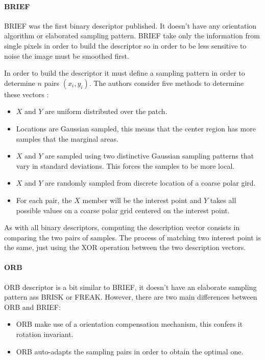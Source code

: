 \documentclass[9pt,shortpaper,twoside,web]{ieeecolor}
\begin{document}
\paragraph{BRIEF}
BRIEF was the first binary descriptor published. It doesn't have any orientation algorithm or elaborated sampling pattern. BRIEF take only the information from single pixels in order to build the descriptor so in order to be less sensitive to noise the image must be smoothed first.

In order to build the descriptor it must define a sampling pattern in order to determine $n$ pairs $(x_i,y_i)$. The authors consider five methods to determine these vectors \cite{b8} :

\begin{itemize}
\item $X$ and $Y$ are uniform distributed over the patch.

\item Locations are Gaussian sampled, this means that the center region has more samples that the marginal areas.

\item $X$ and $Y$ are sampled using two distinctive Gaussian sampling patterns that vary in standard deviations. This forces the samples to be more local.

\item $X$ and $Y$ are randomly sampled from discrete location of a coarse polar gird.

\item For each pair, the $X$ member will be the interest point and $Y$ takes all possible values on a coarse polar grid centered on the interest point.
\end{itemize}

As with all binary descriptors, computing the description vector consists in comparing the two pairs of samples. The process of matching two interest point is the same, just using the XOR operation between the two description vectors.
\\

\paragraph{ORB}
ORB descriptor is a bit similar to BRIEF, it doesn't have an elaborate sampling pattern ass BRISK or FREAK. However, there are two main differences between ORB and BRIEF:

\begin{itemize}
\item ORB make use of a orientation compensation mechanism, this confers it rotation invariant.

\item ORB auto-adapts the sampling pairs in order to obtain the optimal one.
\end{itemize}
\end{document}
